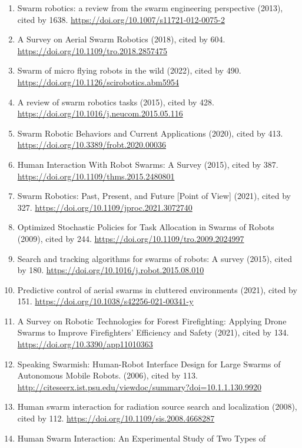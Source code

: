 \documentclass[
]{article}
\providecommand{\tightlist}{%
  \setlength{\itemsep}{0pt}\setlength{\parskip}{0pt}}
\begin{document}
\begin{enumerate}
\def\labelenumi{\arabic{enumi}.}
\tightlist
\item
  Swarm robotics: a review from the swarm engineering perspective
  (2013), cited by 1638. \url{https://doi.org/10.1007/s11721-012-0075-2}
\item
  A Survey on Aerial Swarm Robotics (2018), cited by 604.
  \url{https://doi.org/10.1109/tro.2018.2857475}
\item
  Swarm of micro flying robots in the wild (2022), cited by 490.
  \url{https://doi.org/10.1126/scirobotics.abm5954}
\item
  A review of swarm robotics tasks (2015), cited by 428.
  \url{https://doi.org/10.1016/j.neucom.2015.05.116}
\item
  Swarm Robotic Behaviors and Current Applications (2020), cited by 413.
  \url{https://doi.org/10.3389/frobt.2020.00036}
\item
  Human Interaction With Robot Swarms: A Survey (2015), cited by 387.
  \url{https://doi.org/10.1109/thms.2015.2480801}
\item
  Swarm Robotics: Past, Present, and Future {[}Point of View{]} (2021),
  cited by 327. \url{https://doi.org/10.1109/jproc.2021.3072740}
\item
  Optimized Stochastic Policies for Task Allocation in Swarms of Robots
  (2009), cited by 244. \url{https://doi.org/10.1109/tro.2009.2024997}
\item
  Search and tracking algorithms for swarms of robots: A survey (2015),
  cited by 180. \url{https://doi.org/10.1016/j.robot.2015.08.010}
\item
  Predictive control of aerial swarms in cluttered environments (2021),
  cited by 151. \url{https://doi.org/10.1038/s42256-021-00341-y}
\item
  A Survey on Robotic Technologies for Forest Firefighting: Applying
  Drone Swarms to Improve Firefighters' Efficiency and Safety (2021),
  cited by 134. \url{https://doi.org/10.3390/app11010363}
\item
  Speaking Swarmish: Human-Robot Interface Design for Large Swarms of
  Autonomous Mobile Robots. (2006), cited by 113.
  \url{http://citeseerx.ist.psu.edu/viewdoc/summary?doi=10.1.1.130.9920}
\item
  Human swarm interaction for radiation source search and localization
  (2008), cited by 112. \url{https://doi.org/10.1109/sis.2008.4668287}
\item
  Human Swarm Interaction: An Experimental Study of Two Types of

\end{enumerate}
\end{document}
